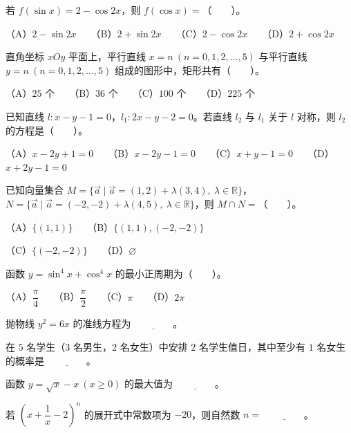 \begin{question}
若 $f(\sin x)=2-\cos 2x$，则 $f(\cos x)=$\mbox{（　　）}。

（A）$2-\sin 2x$　　（B）$2+\sin 2x$　　（C）$2-\cos 2x$　　（D）$2+\cos 2x$

\end{question}
\begin{question}
直角坐标 $xOy$ 平面上，平行直线 $x=n\ (n=0,1,2,\ldots,5)$ 与平行直线 $y=n\ (n=0,1,2,\ldots,5)$ 组成的图形中，矩形共有\mbox{（　　）}。

（A）$25$ 个　　（B）$36$ 个　　（C）$100$ 个　　（D）$225$ 个

\end{question}
\begin{question}
已知直线 $l:x-y-1=0$，$l_1:2x-y-2=0$。若直线 $l_2$ 与 $l_1$ 关于 $l$ 对称，则 $l_2$ 的方程是\mbox{（　　）}。

（A）$x-2y+1=0$　　（B）$x-2y-1=0$　　（C）$x+y-1=0$　　（D）$x+2y-1=0$

\end{question}
\begin{question}
已知向量集合 $M=\{\vec a\mid\vec a=(1,2)+\lambda(3,4),\ \lambda\in\mathbb{R}\}$，$N=\{\vec a\mid\vec a=(-2,-2)+\lambda(4,5),\ \lambda\in\mathbb{R}\}$，则 $M\cap N=$\mbox{（　　）}。

（A）$\{(1,1)\}$　　（B）$\{(1,1),(-2,-2)\}$

（C）$\{(-2,-2)\}$　　（D）$\varnothing$

\end{question}
\begin{question}
函数 $y=\sin^4x+\cos^4x$ 的最小正周期为\mbox{（　　）}。

（A）$\dfrac{\pi}{4}$　　（B）$\dfrac{\pi}{2}$　　（C）$\pi$　　（D）$2\pi$

\end{question}

\begin{question}
抛物线 $y^2=6x$ 的准线方程为 $\underline{\qquad\qquad}$。

\end{question}
\begin{question}
在 $5$ 名学生（$3$ 名男生，$2$ 名女生）中安排 $2$ 名学生值日，其中至少有 $1$ 名女生的概率是 $\underline{\qquad\qquad}$。

\end{question}
\begin{question}
函数 $y=\sqrt{x}-x\ (x\geq 0)$ 的最大值为 $\underline{\qquad\qquad}$。

\end{question}
\begin{question}
若 $\left(x+\dfrac{1}{x}-2\right)^n$ 的展开式中常数项为 $-20$，则自然数 $n=$ $\underline{\qquad\qquad}$。

\end{question}

